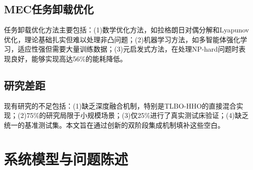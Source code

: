 \documentclass[conference]{IEEEtran}
\begin{document}
\subsection{MEC任务卸载优化}
任务卸载优化方法主要包括：(1)数学优化方法，如拉格朗日对偶分解\cite{b9}和Lyapunov优化\cite{b10}，理论基础扎实但难以处理非凸问题；(2)机器学习方法，如多智能体强化学习\cite{b11,b13}，适应性强但需要大量训练数据；(3)元启发式方法，在处理NP-hard问题时表现良好\cite{b12,b17}，能够实现高达56\%的能耗降低。
\subsection{研究差距}
现有研究的不足包括：(1)缺乏深度融合机制，特别是TLBO-HHO的直接混合实现；(2)75\%的研究局限于小规模场景；(3)仅25\%进行了真实测试床验证；(4)缺乏统一的基准测试集。本文旨在通过创新的双阶段集成机制填补这些空白。
\section{系统模型与问题陈述}
\end{document}
